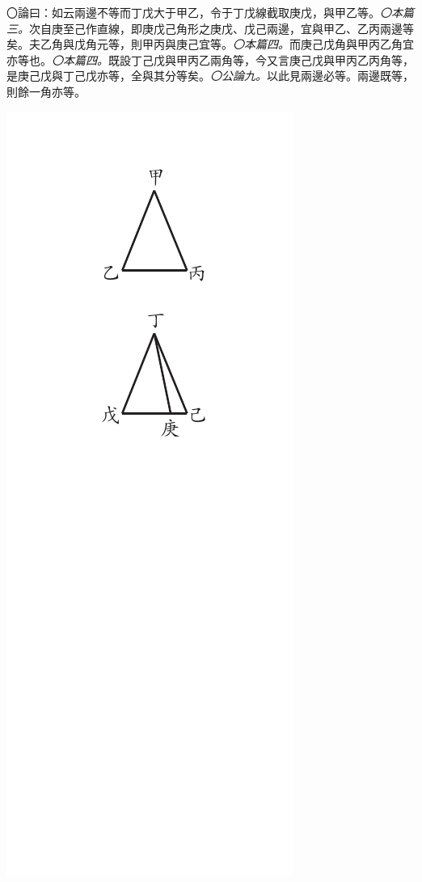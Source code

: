 \documentclass[12pt,b5paper,landscape]{article}
\newcommand{\ccom}[1]{{\footnotesize \emph{〇#1}}}
\newcommand{\bcom}[1]{〇#1}
\begin{document}
\begin{multicols}{2}
\bcom{論曰：如云兩邊不等而丁戊大于甲乙，令于丁戊線截取庚戊，與甲乙等。\ccom{本篇三。}次自庚至己作直線，即庚戊己角形之庚戊、戊己兩邊，宜與甲乙、乙丙兩邊等矣。夫乙角與戊角元等，則甲丙與庚己宜等。\ccom{本篇四。}而庚己戊角與甲丙乙角宜亦等也。\ccom{本篇四。}既設丁己戊與甲丙乙兩角等，今又言庚己戊與甲丙乙丙角等，是庚己戊與丁己戊亦等，全與其分等矣。\ccom{公論九。}以此見兩邊必等。兩邊既等，則餘一角亦等。}
\begin{center}
      \includegraphics[angle=90]{eu73}

\end{center}
\end{multicols}
\end{document}
